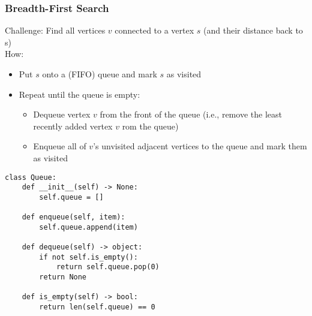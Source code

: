 \documentclass[a4paper]{article}
\begin{document}
\subsubsection*{Breadth-First Search}
Challenge: Find all vertices $v$ connected to a vertex $s$ (and their distance back to s)\\
How: 
\begin{itemize}
    \item Put $s$ onto a (FIFO) queue and mark $s$ as visited
    \item Repeat until the queue is empty:
    \begin{itemize}
        \item Dequeue vertex $v$ from the front of the queue (i.e., remove the least recently added vertex $v$ rom the queue)
        \item Enqueue all of $v$'s unvisited adjacent vertices to the queue and mark them as visited
    \end{itemize}
\end{itemize}

\begin{lstlisting}
class Queue:
    def __init__(self) -> None:
        self.queue = []

    def enqueue(self, item):
        self.queue.append(item)

    def dequeue(self) -> object:
        if not self.is_empty():
            return self.queue.pop(0)
        return None

    def is_empty(self) -> bool:
        return len(self.queue) == 0
\end{lstlisting}
\end{document}
